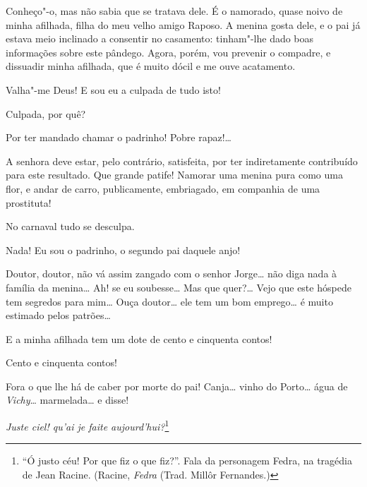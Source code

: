 \begin{linenumbers}
 Conheço"-o, mas não sabia que se tratava dele. É o namorado,
quase noivo de minha afilhada, filha do meu velho amigo Raposo. A
menina gosta dele, e o pai já estava meio inclinado a consentir no
casamento: tinham"-lhe dado boas informações sobre este pândego. Agora,
porém, vou prevenir o compadre, e dissuadir minha afilhada, que é muito
dócil e me ouve acatamento.

 Valha"-me Deus! E sou eu a culpada de tudo isto!

 Culpada, por quê?

 Por ter mandado chamar o padrinho! Pobre rapaz!\ldots{}

 A senhora deve estar, pelo contrário, satisfeita, por ter
indiretamente contribuído para este resultado.  Que grande patife! Namorar uma menina pura como uma
flor, e andar de carro, publicamente, embriagado, em companhia de uma
prostituta!

 No carnaval tudo se desculpa.

 Nada! Eu sou o padrinho, o segundo pai daquele anjo!

  Doutor, doutor, não vá
assim zangado com o senhor Jorge\ldots{} não diga nada à família da
menina\ldots{} Ah! se eu soubesse\ldots{} Mas que quer?\ldots{} Vejo que este hóspede
tem segredos para mim\ldots{}  Ouça
doutor\ldots{} ele tem um bom emprego\ldots{} é muito estimado pelos patrões\ldots{}

 E a minha afilhada tem um dote de cento e cinquenta contos!

  Cento e
cinquenta contos!

  Fora o que lhe há de caber por morte do
pai!  Canja\ldots{} vinho
do Porto\ldots{} água de \textit{Vichy}\ldots{} marmelada\ldots{} e disse!



  \textit{Juste ciel! qu’ai je faite aujourd’hui?}\footnote{
“Ó justo céu! Por que fiz o que fiz?”. Fala da personagem Fedra, na tragédia de
Jean Racine. (Racine, \textit{Fedra} (Trad. Millôr Fernandes.)}


\end{linenumbers}
